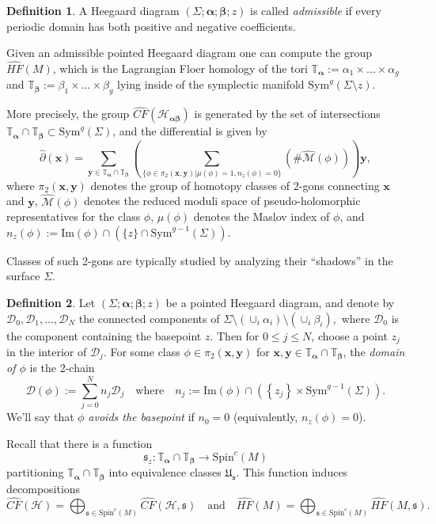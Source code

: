 \documentclass[11pt]{article}
\theoremstyle{plain} \newtheorem{thm}{Theorem}[subsection]
\theoremstyle{plain} \newtheorem{cor}[thm]{Corollary}
\theoremstyle{plain} \newtheorem{prop}[thm]{Proposition}
\theoremstyle{plain} \newtheorem{conj}[thm]{Conjecture}
\theoremstyle{plain} \newtheorem{lem}[thm]{Lemma}
\theoremstyle{definition} \newtheorem{df}[thm]{Definition}
\theoremstyle{remark} \newtheorem{rmk}[thm]{Remark}
\theoremstyle{remark} \newtheorem{obs}[thm]{Observation}
\newcommand{\h}{\mathcal{H}}
\newcommand{\Symg}{\text{Sym}^{g}(\Sigma)}
\newcommand{\HFM}{\widehat{HF}(M)}
\newcommand{\Us}{\mathfrak{U}_{\mathfrak{s}}}
\newcommand{\ba}{\boldsymbol{\alpha}}
\newcommand{\bb}{\boldsymbol{\beta}}
\newcommand{\Ta}{\mathbb{T}_{\ba}}
\newcommand{\Tb}{\mathbb{T}_{\bb}}
\newcommand{\bx}{\mathbf{x}}
\newcommand{\by}{\mathbf{y}}
\numberwithin{equation}{section}
\begin{document}
\begin{df}\label{df:ad}
A Heegaard diagram $\left(\Sigma; \ba; \bb; z\right)$ is called \textit{admissible} if every periodic domain has both positive and negative coefficients.
\end{df}

Given an admissible pointed Heegaard diagram one can compute the group $\widehat{HF}(M)$, which is the Lagrangian Floer homology of the tori $\Ta := \alpha_1 \times \ldots \times \alpha_g$ and $\Tb:= \beta_1 \times \ldots \times \beta_g$ lying inside of the symplectic manifold $\text{Sym}^g(\Sigma \setminus z)$.

More precisely, the group $\widehat{CF}(\h_{\ba\bb})$ is generated by the set of intersections $\Ta \cap \Tb \subset \Symg$, and the differential is given by
$$\widehat{\partial}(\bx) =
\displaystyle\sum_{\by \in \Ta \cap \Tb} \left( \displaystyle\sum_{\{\phi \in \pi_{2}(\bx, \by)| \mu(\phi) = 1, n_{z}(\phi) = 0\}} \left(\# \widehat{\mathcal{M}}\left(\phi\right)\right)\right)\by,
$$
where $\pi_2(\bx,\by)$ denotes the group of homotopy classes of 2-gons connecting $\bx$ and $\by$, $\widehat{\mathcal{M}}(\phi)$ denotes the reduced moduli space of pseudo-holomorphic representatives for the class $\phi$, $\mu(\phi)$ denotes the Maslov index of $\phi$, and $n_z(\phi):=\text{Im}(\phi) \cap \left( \{ z \} \cap \text{Sym}^{g-1}(\Sigma)\right).$

Classes of such 2-gons are typically studied by analyzing their ``shadows'' in the surface $\Sigma$.

\begin{df}
Let $\left( \Sigma; \ba ; \bb; z \right)$ be a pointed Heegaard diagram, and denote by $\mathcal{D}_0, \mathcal{D}_1, \ldots, \mathcal{D}_N$ the connected components of $\Sigma \setminus \left( \cup_i \alpha_i\right) \setminus \left( \cup_i \beta_i \right),$ where $\mathcal{D}_0$ is the component containing the basepoint $z$.  Then for $0 \leq j \leq N$, choose a point $z_j$ in the interior of $\mathcal{D}_j$.  For some class $\phi \in \pi_2(\bx, \by)$ for $\bx, \by \in \Ta \cap \Tb$, the \textit{domain of $\phi$}  is the 2-chain
$$\mathcal{D}(\phi):= \sum_{j = 0}^{N} n_j \mathcal{D}_j \quad \text{where} \quad n_j:= \text{Im}(\phi) \cap \left(\left \{ z_j \right\} \times \text{Sym}^{g-1}(\Sigma) \right).$$
We'll say that $\phi$ \textit{avoids the basepoint} if $n_0 = 0$ (equivalently, $n_z(\phi) = 0$).
\end{df}

Recall that there is a function
\begin{equation*}
\mathfrak{s}_{z}: \Ta \cap \Tb \longrightarrow \text{Spin}^{c}(M)
\end{equation*}
partitioning $\Ta \cap \Tb$ into equivalence classes $\Us$.  This function induces decompositions
\begin{equation*}
\widehat{CF}(\h)  = \displaystyle \bigoplus_{\mathfrak{s} \in \text{Spin}^{c}(M)} \widehat{CF}(\h, \mathfrak{s}) \quad \text{and} \quad
\HFM = \displaystyle \bigoplus_{\mathfrak{s} \in \text{Spin}^{c}(M)} \widehat{HF}(M, \mathfrak{s}).
\end{equation*}
\end{document}
